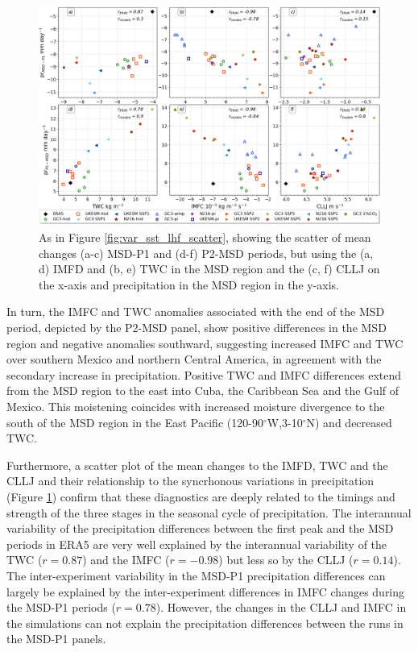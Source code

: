  \begin{figure}[t!]
\includegraphics[width=\linewidth]{figures/imfd_scatter}
\caption[Scatterplot of TWC, IMFD and CLLJ]{As in Figure \ref{fig:var_sst_lhf_scatter}, showing the scatter of mean changes (a-c) MSD-P1 and (d-f) P2-MSD periods, but using the (a, d) IMFD and (b, e) TWC in the MSD region and the (c, f) CLLJ on the x-axis and precipitation in the MSD region in the y-axis.  }
\label{fig:imfd_scatter}
\end{figure}


In turn, the IMFC and TWC anomalies associated with the end of the MSD period, depicted by the P2-MSD panel,  show positive differences in the MSD region and negative anomalies southward, suggesting increased IMFC and TWC over southern Mexico and northern Central America, in agreement with the secondary increase in precipitation. Positive TWC and IMFC differences extend from the MSD region to the east into Cuba, the Caribbean Sea and the Gulf of Mexico. This moistening coincides with increased moisture divergence to the south of the MSD region in the East Pacific (120-90$^\circ$W,3-10$^\circ$N) and decreased TWC. 


Furthermore, a scatter plot of the mean changes to the IMFD, TWC and the CLLJ and their relationship to the syncrhonous variations in precipitation (Figure \ref{fig:imfd_scatter}) confirm that these diagnostics are deeply related to the timings and strength of the three stages in the seasonal cycle of precipitation. The interannual variability of the precipitation differences between the first peak and the MSD periods in ERA5  are very well explained by the interannual variability of the TWC ($r=0.87$) and the IMFC ($r=-0.98$) but less so by the CLLJ ($r=0.14$). The inter-experiment variability in the MSD-P1 precipitation differences can largely be explained by the inter-experiment differences in IMFC changes during the MSD-P1 periods ($r=0.78$). However, the changes in the CLLJ and IMFC in the simulations can not explain the precipitation differences between the runs in the MSD-P1 panels. 

